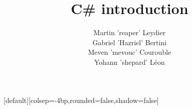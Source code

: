 [default][colsep=-4bp,rounded=false,shadow=false]
\title{C\# introduction}
\author{Martin 'reaper' Leydier \\ Gabriel 'Hazriel' Bertini \\ Meven 'mevouc' Courouble \\ Yohann 'shepard' Léon}
